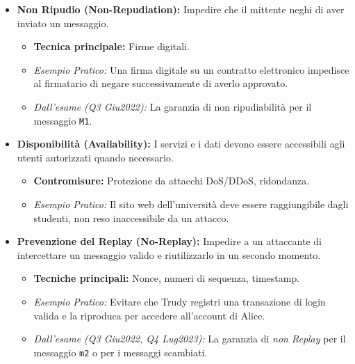 \begin{itemize}
    \item \textbf{Non Ripudio (Non-Repudiation):} Impedire che il mittente neghi di aver inviato un messaggio.
    \begin{itemize}
        \item \textbf{Tecnica principale:} Firme digitali.
        \item \emph{Esempio Pratico:} Una firma digitale su un contratto elettronico impedisce al firmatario di negare successivamente di averlo approvato.
        \item \emph{Dall'esame (Q3 Giu2022):} La garanzia di non ripudiabilità per il messaggio \texttt{M1}.
    \end{itemize}

    \item \textbf{Disponibilità (Availability):} I servizi e i dati devono essere accessibili agli utenti autorizzati quando necessario.
    \begin{itemize}
        \item \textbf{Contromisure:} Protezione da attacchi DoS/DDoS, ridondanza.
        \item \emph{Esempio Pratico:} Il sito web dell'università deve essere raggiungibile dagli studenti, non reso inaccessibile da un attacco.
    \end{itemize}

    \item \textbf{Prevenzione del Replay (No-Replay):} Impedire a un attaccante di intercettare un messaggio valido e riutilizzarlo in un secondo momento.
    \begin{itemize}
        \item \textbf{Tecniche principali:} Nonce, numeri di sequenza, timestamp.
        \item \emph{Esempio Pratico:} Evitare che Trudy registri una transazione di login valida e la riproduca per accedere all'account di Alice.
        \item \emph{Dall'esame (Q3 Giu2022, Q4 Lug2023):} La garanzia di \textit{non Replay} per il messaggio \texttt{m2} o per i messaggi scambiati.
    \end{itemize}
\end{itemize}

